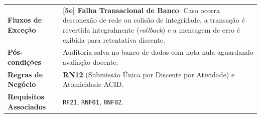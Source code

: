 \begin{table}[!ht]
\begin{tabularx}{\textwidth}{p{3.5cm} X}
\textbf{Fluxos de Exceção} & 
\textbf{[5e] Falha Transacional de Banco}: Caso ocorra desconexão de rede ou colisão de integridade, a transação é revertida integralmente (\textit{rollback}) e a mensagem de erro é exibida para retentativa discente. \\
\textbf{Pós-condições} & Auditoria salva no banco de dados com nota nula aguardando avaliação docente. \\
\textbf{Regras de Negócio} & \textbf{RN12} (Submissão Única por Discente por Atividade) e Atomicidade ACID. \\
\textbf{Requisitos Associados} & \texttt{RF21}, \texttt{RNF01}, \texttt{RNF02}. \\
\bottomrule
\end{tabularx}
\end{table}
